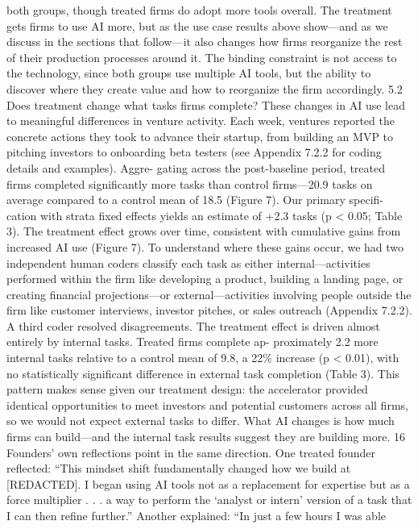 both groups, though treated firms do adopt more tools overall. The treatment gets firms to use
AI more, but as the use case results above show—and as we discuss in the sections that follow—it
also changes how firms reorganize the rest of their production processes around it. The binding
constraint is not access to the technology, since both groups use multiple AI tools, but the ability
to discover where they create value and how to reorganize the firm accordingly.
5.2
Does treatment change what tasks firms complete?
These changes in AI use lead to meaningful differences in venture activity. Each week, ventures
reported the concrete actions they took to advance their startup, from building an MVP to pitching
investors to onboarding beta testers (see Appendix 7.2.2 for coding details and examples). Aggre-
gating across the post-baseline period, treated firms completed significantly more tasks than control
firms—20.9 tasks on average compared to a control mean of 18.5 (Figure 7). Our primary specifi-
cation with strata fixed effects yields an estimate of +2.3 tasks (p < 0.05; Table 3). The treatment
effect grows over time, consistent with cumulative gains from increased AI use (Figure 7).
To understand where these gains occur, we had two independent human coders classify each
task as either internal—activities performed within the firm like developing a product, building a
landing page, or creating financial projections—or external—activities involving people outside the
firm like customer interviews, investor pitches, or sales outreach (Appendix 7.2.2). A third coder
resolved disagreements.
The treatment effect is driven almost entirely by internal tasks. Treated firms complete ap-
proximately 2.2 more internal tasks relative to a control mean of 9.8, a 22\% increase (p < 0.01),
with no statistically significant difference in external task completion (Table 3). This pattern makes
sense given our treatment design: the accelerator provided identical opportunities to meet investors
and potential customers across all firms, so we would not expect external tasks to differ. What AI
changes is how much firms can build—and the internal task results suggest they are building more.
16
Founders’ own reflections point in the same direction. One treated founder reflected: “This
mindset shift fundamentally changed how we build at [REDACTED]. I began using AI tools not as
a replacement for expertise but as a force multiplier . . . a way to perform the ‘analyst or intern’
version of a task that I can then refine further.” Another explained: “In just a few hours I was able
